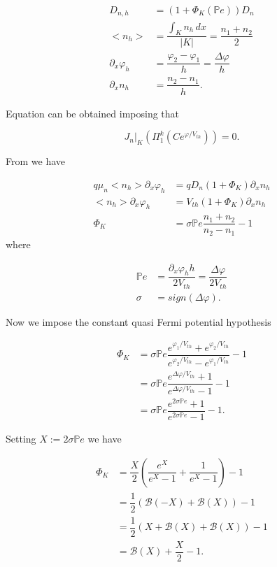 \begin{align*}
D_{n,h} & = (1+\Phi_K(\mathbb{P}e))D_n \\
<n_h> & = \dfrac{\int_K n_h \, dx}{|K|} = \dfrac{n_1+n_2}{2} \\
\partial_x \varphi_h & = \dfrac{\varphi_2-\varphi_1}{h} = \dfrac{\Delta \varphi}{h}\\
\partial_x n_h & = \dfrac{n_2 - n_1}{h}.
\end{align*}

Equation  can be obtained imposing that

\begin{equation}
J_n|_K(\Pi_1^k(Ce^{\varphi / V_{th}})) = 0 .
\end{equation}

From  we have

\begin{align*}
q\mu_n <n_h>\partial_x \varphi_h & = q D_ n(1+\Phi_K)\partial_x n_h \\
<n_h>\partial_x \varphi_h & = V_{th}(1+\Phi_K)\partial_x n_h \\
\Phi_K & = \sigma \mathbb{P}e \dfrac{n_1+n_2}{n_2-n_1}  -1
\end{align*}
where 

\begin{align*}
\mathbb{P}e & = \dfrac{\partial_x \varphi_h h}{2V_{th}}  = \dfrac{\Delta \varphi }{2 V_{th}} \\
\sigma & = sign(\Delta \varphi).
\end{align*}

Now we impose the constant quasi Fermi potential hypothesis

\begin{align*}
\Phi_K & = \sigma \mathbb{P}e \dfrac{e^{\varphi_1/V_{th}}+e^{\varphi_2/V_{th}}}{e^{\varphi_2/V_{th}}-e^{\varphi_1/V_{th}}} -1 \\
& = \sigma \mathbb{P}e \dfrac{e^{\Delta \varphi/V_{th}}+1}{e^{\Delta \varphi/V_{th}}-1} -1 \\
& = \sigma \mathbb{P}e \dfrac{e^{2 \sigma \mathbb{P}e}+1}{e^{2\sigma \mathbb{P}e}-1} -1.
\end{align*}

Setting $X := 2 \sigma \mathbb{P}e$ we have

\begin{align*}
\Phi_K & = \dfrac{X}{2} \left( \dfrac{e^{X}}{e^{X}-1} + \dfrac{1}{e^{X}-1} \right) -1 \\
& = \dfrac{1}{2} \left( \mathcal{B}(-X) + \mathcal{B}(X) \right) -1 \\
 & = \dfrac{1}{2} \left( X + \mathcal{B}(X) + \mathcal{B}(X) \right) -1 \\
  & =  \mathcal{B}(X) +\dfrac{X}{2}  -1.
\end{align*}

